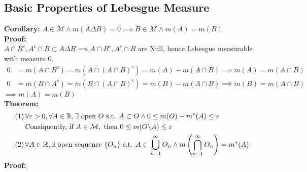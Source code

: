 \documentclass{article}
\newcommand{\R}{\mathbb{R}}
\newcommand{\infcap}{\bigcap\limits_{n=1}^\infty}
\newcommand{\infcup}{\bigcup\limits_{n=1}^\infty}
\newcommand{\st}{\mbox{ s.t. }}
\newcommand{\0}{{\bf{0}}}
\newcommand{\1}{{\bf{1}}}
\begin{document}
\subsection{Basic Properties of Lebesgue Measure}
\textbf{Corollary:} $A\in\mathcal{M}\land m(A\Delta B)=0\implies B\in\mathcal{M}\land m(A)=m(B)$\\
\textbf{Proof:}\\
$A\cap B^c,A^c\cap B\subset A\Delta B\implies A\cap B^c,A^c\cap B$ are Null, hence Lebesgue measurable with measure 0.
\begin{equation}
\begin{split}
    0&=m(A\cap B^c)=m(A\cap (A\cap B)^c)=m(A)-m(A\cap B)\implies m(A)=m(A\cap B)\\
    0&=m(B\cap A^c)=m(B\cap (A\cap B)^c)=m(B)-m(A\cap B)\implies m(B)=m(A\cap B)
\end{split}
\end{equation}
$\implies m(A)=m(B)$\\
\textbf{Theorem:}
\begin{equation}
\begin{split}
    (1)\,&\forall\varepsilon>0,\forall A\in\R,\exists\mbox{ open }O\st A\subset O\land0\le m(O)-m^*(A)\le\varepsilon\\
    &\mbox{Consiquently, if }A\in\mathcal{M},\mbox{ then }0\le m(O\symbol{92}A)\le\varepsilon\\
    (2)\,&\forall A\in\R,\exists\mbox{ open sequence }\{O_n\}\st A\subset\infcup O_n\land m\left(\infcap O_n\right)=m^*(A)
\end{split}
\end{equation}
\textbf{Proof:}
\end{document}
